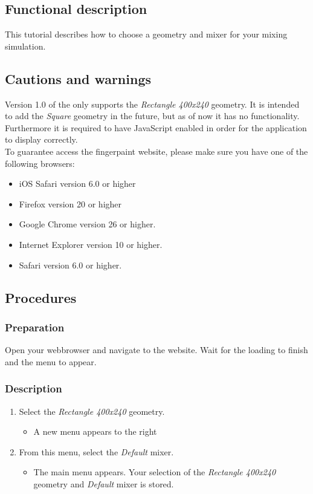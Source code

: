 \subsection{Functional description}
This tutorial describes how to choose a geometry and mixer for your mixing simulation.

\subsection{Cautions and warnings}

Version 1.0 of the \applicationname{} only supports the \emph{Rectangle 400x240} geometry. It is intended to add the \emph{Square} geometry in the future, but as of now it has no functionality. Furthermore it is required to have JavaScript enabled in order for the application to display correctly.\\

\noindent To guarantee access the fingerpaint website, please make sure you have one of the following browsers:\\
\begin{itemize}
\item iOS Safari version 6.0 or higher
\item Firefox version 20 or higher
\item Google Chrome version 26 or higher.
\item Internet Explorer version 10 or higher.
\item Safari version 6.0 or higher.
\end{itemize}

\subsection{Procedures}

\subsubsection{Preparation}
Open your webbrowser and navigate to the \projectname website. Wait for the loading to finish and the menu to appear.

\subsubsection{Description}

\begin{enumerate}
\item Select the \emph{Rectangle 400x240} geometry.
\begin{itemize}
  \item A new menu appears to the right
\end{itemize}
\item From this menu, select the \emph{Default} mixer.
\begin{itemize}
  \item The main menu appears. Your selection of the \emph{Rectangle 400x240} geometry and \emph{Default} mixer is stored.
\end{itemize}
\end{enumerate}

